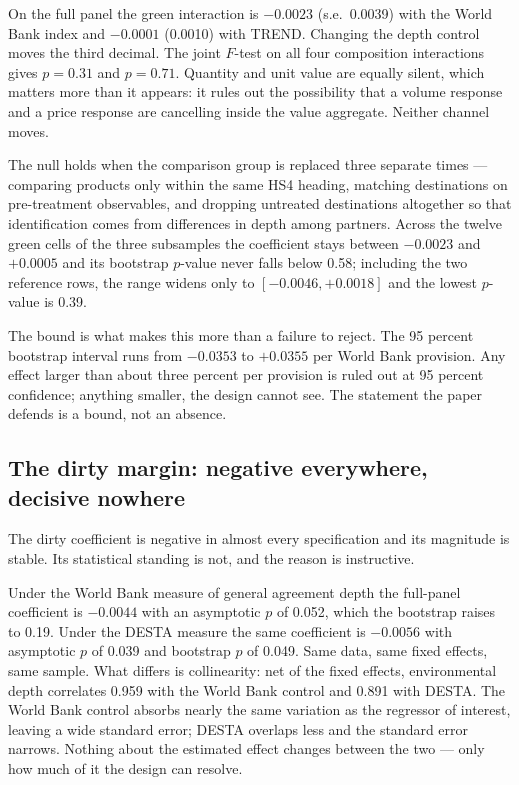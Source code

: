\documentclass[11pt]{article}
\begin{document}
On the full panel the green interaction is $-0.0023$ (s.e.\ 0.0039) with the World Bank index and
$-0.0001$ (0.0010) with TREND. Changing the depth control moves the third decimal. The joint $F$-test
on all four composition interactions gives $p = 0.31$ and $p = 0.71$. Quantity and unit value are
equally silent, which matters more than it appears: it rules out the possibility that a volume
response and a price response are cancelling inside the value aggregate. Neither channel moves.

The null holds when the comparison group is replaced three separate times --- comparing products only
within the same HS4 heading, matching destinations on pre-treatment observables, and dropping
untreated destinations altogether so that identification comes from differences in depth among
partners. Across the twelve green cells of the three subsamples the coefficient stays between $-0.0023$ and
$+0.0005$ and its bootstrap $p$-value never falls below 0.58; including the two reference rows, the
range widens only to $[-0.0046, +0.0018]$ and the lowest $p$-value is 0.39.

The bound is what makes this more than a failure to reject. The 95 percent bootstrap interval runs
from $-0.0353$ to $+0.0355$ per World Bank provision. Any effect larger than about three percent per
provision is ruled out at 95 percent confidence; anything smaller, the design cannot see. The
statement the paper defends is a bound, not an absence.

\subsection*{The dirty margin: negative everywhere, decisive nowhere}

The dirty coefficient is negative in almost every specification and its magnitude is stable. Its
statistical standing is not, and the reason is instructive.

Under the World Bank measure of general agreement depth the full-panel coefficient is $-0.0044$ with
an asymptotic $p$ of 0.052, which the bootstrap raises to 0.19. Under the DESTA measure the same
coefficient is $-0.0056$ with asymptotic $p$ of 0.039 and bootstrap $p$ of 0.049. Same data, same
fixed effects, same sample. What differs is collinearity: net of the fixed effects, environmental
depth correlates 0.959 with the World Bank control and 0.891 with DESTA. The World Bank control
absorbs nearly the same variation as the regressor of interest, leaving a wide standard error; DESTA
overlaps less and the standard error narrows. Nothing about the estimated effect changes between the
two --- only how much of it the design can resolve.
\end{document}

